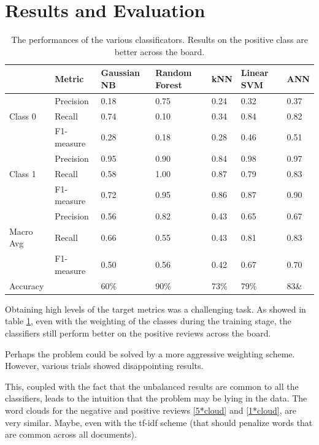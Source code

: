 \section{Results and Evaluation}
\begin{table}[]
\begin{tabular}{|l|l|l|l|l|l|l|}
\hline
&
  Metric &
  Gaussian NB &
  Random Forest &
  kNN &
  Linear SVM &
  ANN \\
  \hline
  & Precision & 0.18 & 0.75 & 0.24 & 0.32 & 0.37 \\
  Class 0 & Recall & 0.74 & 0.10 & 0.34 & 0.84 & 0.82 \\
  & F1-measure & 0.28 & 0.18 & 0.28 & 0.46 & 0.51 \\
  \hline
  & Precision & 0.95 & 0.90 & 0.84 & 0.98 & 0.97 \\
  Class 1 & Recall & 0.58 & 1.00 & 0.87 & 0.79 & 0.83 \\
  & F1-measure & 0.72 & 0.95 & 0.86 & 0.87 & 0.90 \\
  \hline
  & Precision & 0.56 & 0.82 & 0.43 & 0.65 & 0.67 \\
  Macro Avg & Recall & 0.66 & 0.55 & 0.43 & 0.81 & 0.83 \\
  & F1-measure & 0.50 & 0.56 & 0.42 & 0.67 & 0.70 \\
  \hline
  Accuracy & & 60\% & 90\% & 73\% & 79\% & 83\& \\
  \hline
\end{tabular}
\caption{The performances of the various classificators. Results on the positive class are better across the board.}
\label{tab:class}
\end{table}



Obtaining high levels of the target metrics was a challenging task. As showed in table \ref{tab:class}, even with the weighting of the classes during the training stage, the classifiers still perform better on the positive reviews across the board.

Perhaps the problem could be solved by a more aggressive weighting scheme. However, various trials showed disappointing results.

This, coupled with the fact that the unbalanced results are common to all the classifiers, leads to the intuition that the problem may be lying in the data. The word clouds for the negative and positive reviews \ref{5*cloud} and \ref{1*cloud}, are very similar. Maybe, even with the tf-idf scheme (that should penalize words that are common across all documents).

